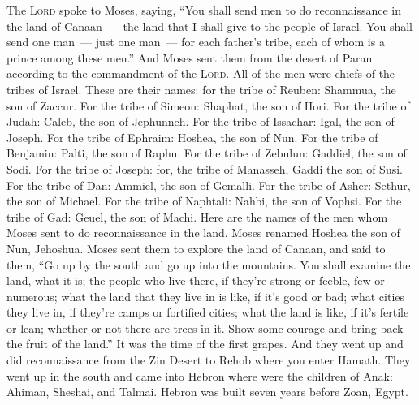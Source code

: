 
\begin{inparaenum}
     The \textsc{Lord} spoke to Moses, saying,%
     ``You shall send men to do reconnaissance in the land of Canaan~--- the land that I shall give to the people of Israel. You shall send one man~--- just one man~--- for each father's tribe, each of whom is a prince among these men.''%
     And Moses sent them from the desert of Paran according to the commandment of the \textsc{Lord}. All of the men were chiefs of the tribes of Israel.%
     These are their names: for the tribe of Reuben: Shammua, the son of Zaccur.%
     For the tribe of Simeon: Shaphat, the son of Hori.%
     For the tribe of Judah: Caleb, the son of Jephunneh.%
     For the tribe of Issachar: Igal, the son of Joseph.%
     For the tribe of Ephraim: Hoshea, the son of Nun.%
     For the tribe of Benjamin: Palti, the son of Raphu.%
     For the tribe of Zebulun: Gaddiel, the son of Sodi.%
     For the tribe of Joseph: for, the tribe of Manasseh, Gaddi the son of Susi.%
     For the tribe of Dan: Ammiel, the son of Gemalli.%
     For the tribe of Asher: Sethur, the son of Michael.%
     For the tribe of Naphtali: Nahbi, the son of Vophsi.%
     For the tribe of Gad: Geuel, the son of Machi.%
     Here are the names of the men whom Moses sent to do reconnaissance in the land. Moses renamed Hoshea the son of Nun, Jehoshua.%
     Moses sent them to explore the land of Canaan, and said to them, ``Go up by the south and go up into the mountains.%
     You shall examine the land, what it is; the people who live there, if they're strong or feeble, few or numerous;%
     what the land that they live in is like, if it's good or bad; what cities they live in, if they're camps or fortified cities;%
     what the land is like, if it's fertile or lean; whether or not there are trees in it. Show some courage and bring back the fruit of the land.'' It was the time of the first grapes.%
     And they went up and did reconnaissance from the Zin Desert to Rehob where you enter Hamath.%
     They went up in the south and came into Hebron where were the children of Anak: Ahiman, Sheshai, and Talmai. Hebron was built seven years before Zoan, Egypt.%

\end{inparaenum}
